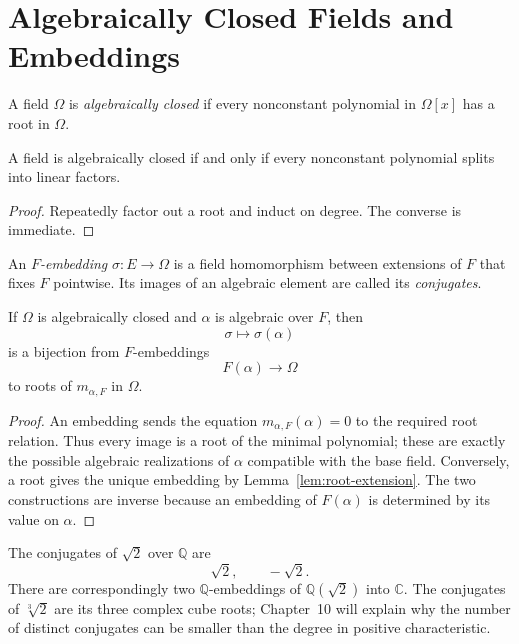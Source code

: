 \section{Algebraically Closed Fields and Embeddings}
\begin{definition}
A field \(\Omega\) is \emph{algebraically closed} if every nonconstant
polynomial in \(\Omega[x]\) has a root in \(\Omega\).
\end{definition}
\begin{proposition}
A field is algebraically closed if and only if every nonconstant polynomial
splits into linear factors.
\end{proposition}
\begin{proof}
Repeatedly factor out a root and induct on degree.  The converse is immediate.
\end{proof}

\begin{definition}
An \emph{\(F\)-embedding} \(\sigma:E\to\Omega\) is a field homomorphism
between extensions of \(F\) that fixes \(F\) pointwise.  Its images of an
algebraic element are called its \emph{conjugates}.
\end{definition}

\begin{proposition}\label{prop:embeddings-roots}
If \(\Omega\) is algebraically closed and \(\alpha\) is algebraic over \(F\),
then
\[
\sigma\longmapsto\sigma(\alpha)
\]
is a bijection from \(F\)-embeddings
\[
F(\alpha)\longrightarrow\Omega
\]
to roots of \(m_{\alpha,F}\) in \(\Omega\).
\end{proposition}
\begin{proof}
An embedding sends the equation \(m_{\alpha,F}(\alpha)=0\) to the required
root relation.  Thus every image is a root of the minimal polynomial; these
are exactly the possible algebraic realizations of \(\alpha\) compatible with
the base field.  Conversely, a root gives the unique embedding by
Lemma~\ref{lem:root-extension}.  The two constructions are inverse because
an embedding of \(F(\alpha)\) is determined by its value on \(\alpha\).
\end{proof}

\begin{example}
The conjugates of \(\sqrt2\) over \(\mathbb Q\) are
\[
\sqrt2,\qquad-\sqrt2.
\]
There are correspondingly two \(\mathbb Q\)-embeddings of
\(\mathbb Q(\sqrt2)\) into \(\mathbb C\).  The conjugates of
\(\sqrt[3]2\) are its three complex cube roots; Chapter~10 will explain why
the number of distinct conjugates can be smaller than the degree in positive
characteristic.
\end{example}

